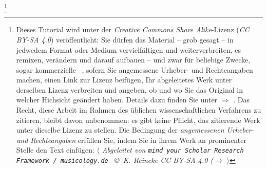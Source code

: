 %
%
%

\footnote{Dieses Tutorial wird unter der \textit{Creative Commons Share
Alike}-Lizenz (\textit{CC BY-SA 4.0}) veröffentlicht: Sie dürfen das Material
-- grob gesagt -- in jedwedem Format oder Medium vervielfältigen und
weiterverbreiten, es remixen, verändern und darauf aufbauen -- und zwar für
beliebige Zwecke, sogar kommerzielle --, sofern Sie angemessene Urheber- und
Rechteangaben machen, einen Link zur Lizenz beifügen, Ihr abgeleitetes Werk
unter derselben Lizenz verbreiten und angeben, ob und wo Sie das Original in
welcher Hichsicht geändert haben. Details dazu finden Sie unter $\Rightarrow$
.
Das Recht, diese Arbeit im Rahmen des üblichen wissenschaftlichen Verfahrens zu
zitieren, bleibt davon unbenommen: es gibt keine Pflicht, das zitierende Werk
unter dieselbe Lizenz zu stellen. Die Bedingung der \textit{an\-ge\-mes\-se\-nen
Urheber- und Rechteangaben} erfüllen Sie, indem Sie in ihrem Werk an prominenter
Stelle den Text einfügen: $\langle$ {\itshape Abgeleitet von \texttt{mind your
Scholar Research Framework / musicology.de } \copyright\ K. Reincke CC BY-SA 4.0
($\rightarrow$
 }
$\rangle$ }

